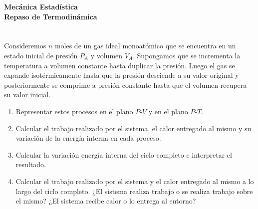\documentclass[a4paper,11pt]{article}
\begin{document}
\pagestyle{fancy}
\chead{\small \the\year}



\thispagestyle{plain}
\begin{center}
    \textbf{\large
        Mecánica Estadística \\
        Repaso de Termodinámica
    }
\end{center}
\vspace{-1.5em}



\section{}

Consideremos $n$ moles de un gas ideal monoatómico que se encuentra en 
un estado inicial de presión $P_A$ y volumen $V_A$. Supongamos que se 
incrementa la temperatura a volumen constante hasta duplicar la 
presión. Luego el gas se expande isotérmicamente hasta que la presión 
desciende a su valor original y posteriormente se comprime a presión 
constante hasta que el volumen recupera su valor inicial.

\begin{enumerate}[label=(\alph*),
                  leftmargin=2\parindent,
                  rightmargin=2\parindent]

    \item{Representar estos procesos en el plano $P$-$V$ y en el plano 
          $P$-$T$.}
    
    \item{Calcular el trabajo realizado por el sistema, el calor 
          entregado al mismo y su variación de la energía interna en 
          cada proceso.}
    
    \item{Calcular la variación energía interna del ciclo completo e 
          interpretar el resultado.}
    
    \item{Calcular el trabajo realizado por el sistema y el calor 
          entregado al mismo a lo largo del ciclo completo. ¿El sistema 
          realiza trabajo o se realiza trabajo sobre el mismo? ¿El 
          sistema recibe calor o lo entrega al entorno?}

\end{enumerate}
\end{document}
